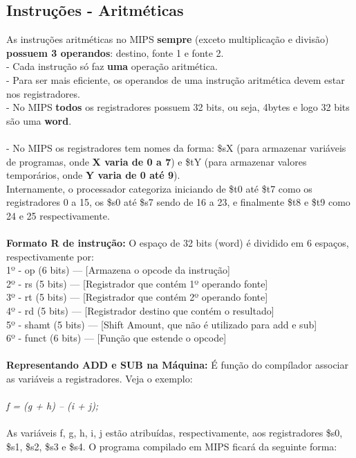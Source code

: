 \documentclass[12pt]{article}
\begin{document}
    \subsection{Instruções - Aritméticas}
    As instruções aritméticas no MIPS \textbf{sempre} (exceto multiplicação e divisão) \textbf{possuem 3 operandos}: destino, fonte 1 e fonte 2.
    \\- Cada instrução só faz \textbf{uma} operação aritmética.
    \\- Para ser mais eficiente, os operandos de uma instrução aritmética devem estar nos registradores.
    \\- No MIPS \textbf{todos} os registradores possuem 32 bits, ou seja, 4bytes e logo 32 bits são uma \textbf{word}.
    \\~\\- No MIPS os registradores tem nomes da forma: \$sX (para armazenar variáveis de programas, onde \textbf{X varia de 0 a 7}) e \$tY (para armazenar valores temporários, onde \textbf{Y varia de 0 até 9}).
    \\Internamente, o processador categoriza iniciando de \$t0 até \$t7 como os registradores 0 a 15, os \$s0 até \$s7 sendo de 16 a 23, e finalmente \$t8 e \$t9 como 24 e 25 respectivamente.
    \\~\\\textbf{Formato R de instrução:} O espaço de 32 bits (word) é dividido em 6 espaços, respectivamente por:
    \\1º - op (6 bits) --- [Armazena o opcode da instrução]
    \\2º - rs (5 bits) --- [Registrador que contém 1º operando fonte]
    \\3º - rt (5 bits) --- [Registrador que contém 2º operando fonte]
    \\4º - rd (5 bits)  --- [Registrador destino que contém o resultado]
    \\5º - shamt (5 bits)  --- [Shift Amount, que não é utilizado para add e sub]
    \\6º - funct (6 bits) --- [Função que estende o opcode]
    \\~\\\textbf{Representando ADD e SUB na Máquina:} É função do compílador associar as variáveis a registradores. Veja o exemplo:
    \\~\\\textit{f = (g + h) – (i + j);}
    \\~\\ As variáveis f, g, h, i, j estão atribuídas, respectivamente, aos registradores  \$s0, \$s1, \$s2, \$s3 e \$s4. O programa compilado em MIPS ficará da seguinte forma:
\end{document}

